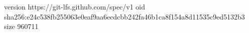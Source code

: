 version https://git-lfs.github.com/spec/v1
oid sha256:e24c538fb255063e0eaf9aa6ecdcbb242fa46b1ca8f154a8d11535c9ed5132b3
size 960711
